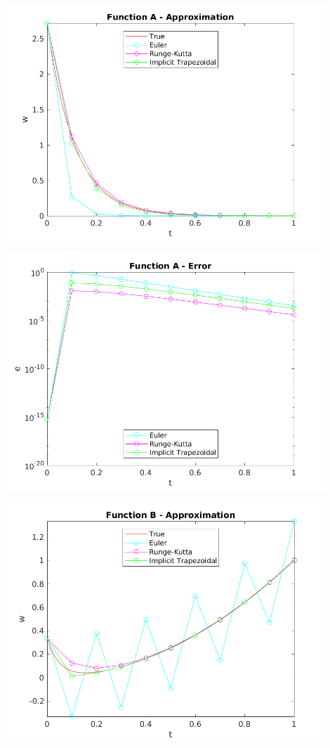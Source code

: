 \documentclass{article}
\begin{document}
\begin{center}
  \includegraphics[width=0.9\textwidth]{../output/a_compare_val.png}
  \label{fig:a_compare_val}
\end{center}

\begin{center}
  \includegraphics[width=0.9\textwidth]{../output/a_compare_err.png}
  \label{fig:a_compare_err}
\end{center}

\begin{center}
  \includegraphics[width=0.9\textwidth]{../output/b_compare_val.png}
  \label{fig:b_compare_val}
\end{center}
\end{document}
